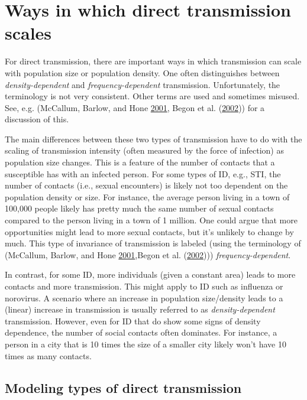 \documentclass[]{book}
\theoremstyle{definition}
\theoremstyle{definition}
\theoremstyle{definition}
\theoremstyle{remark}
\begin{document}
\section{Ways in which direct transmission
scales}\label{ways-in-which-direct-transmission-scales}

For direct transmission, there are important ways in which transmission
can scale with population size or population density. One often
distinguishes between \emph{density-dependent} and
\emph{frequency-dependent} transmission. Unfortunately, the terminology
is not very consistent. Other terms are used and sometimes misused. See,
e.g. (McCallum, Barlow, and Hone
\protect\hyperlink{ref-mccallum01}{2001}, Begon et al.
(\protect\hyperlink{ref-begon02}{2002})) for a discussion of this.

The main differences between these two types of transmission have to do
with the scaling of transmission intensity (often measured by the force
of infection) as population size changes. This is a feature of the
number of contacts that a susceptible has with an infected person. For
some types of ID, e.g., STI, the number of contacts (i.e., sexual
encounters) is likely not too dependent on the population density or
size. For instance, the average person living in a town of 100,000
people likely has pretty much the same number of sexual contacts
compared to the person living in a town of 1 million. One could argue
that more opportunities might lead to more sexual contacts, but it's
unlikely to change by much. This type of invariance of transmission is
labeled (using the terminology of (McCallum, Barlow, and Hone
\protect\hyperlink{ref-mccallum01}{2001},Begon et al.
(\protect\hyperlink{ref-begon02}{2002}))) \emph{frequency-dependent}.

In contrast, for some ID, more individuals (given a constant area) leads
to more contacts and more transmission. This might apply to ID such as
influenza or norovirus. A scenario where an increase in population
size/density leads to a (linear) increase in transmission is usually
referred to as \emph{density-dependent} transmission. However, even for
ID that do show some signs of density dependence, the number of social
contacts often dominates. For instance, a person in a city that is 10
times the size of a smaller city likely won't have 10 times as many
contacts.

\subsection{Modeling types of direct transmission}\label{myadvancedbox}
\end{document}
